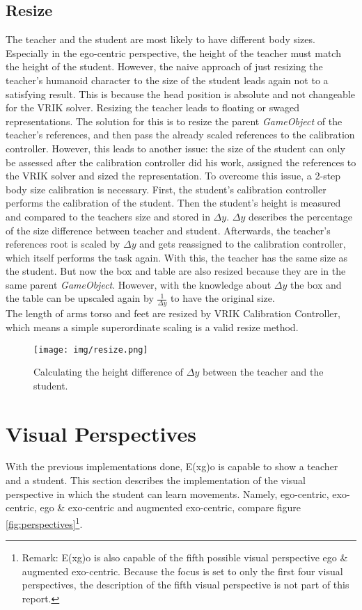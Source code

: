 \subsection{Resize}
The teacher and the student are most likely to have different body sizes. Especially in the ego-centric perspective, the height of the teacher must match the height of the student. However, the naive approach of just resizing the teacher's humanoid character to the size of the student leads again not to a satisfying result. This is because the head position is absolute and not changeable for the VRIK solver. Resizing the teacher leads to floating or swaged representations. The solution for this is to resize the parent \textit{GameObject} of the teacher's references, and then pass the already scaled references to the calibration controller. However, this leads to another issue: the size of the student can only be assessed after the calibration controller did his work, assigned the references to the VRIK solver and sized the representation. To overcome this issue, a 2-step body size calibration is necessary. First, the student's calibration controller performs the calibration of the student. Then the student's height is measured and compared to the teachers size and stored in $\Delta y$. $\Delta y$ describes the percentage of the size difference between teacher and student. Afterwards, the teacher's references root is scaled by $\Delta y$ and gets reassigned to the calibration controller, which itself performs the task again. With this, the teacher has the same size as the student. But now the box and table are also resized because they are in the same parent \textit{GameObject}. However, with the knowledge about $\Delta y$ the box and the table can be upscaled again by $\frac{1}{\Delta y}$ to have the original size.\\
The length of arms torso and feet are resized by VRIK Calibration Controller, which means a simple superordinate scaling is a valid resize method.
\begin{figure}
	\centering
	\texttt{[image: img/resize.png]}
	\caption{Calculating the height difference of $\Delta y$ between the teacher and the student.}
	\label{fig:resize}
\end{figure}


\section{Visual Perspectives}
With the previous implementations done, E(x\textbar g)o is capable to show a teacher and a student. This section describes the implementation of the visual perspective in which the student can learn movements. Namely, ego-centric, exo-centric, ego \& exo-centric and augmented exo-centric, compare figure \ref{fig:perspectives}\footnote{Remark: E(x\textbar g)o is also capable of the fifth possible visual perspective ego \& augmented exo-centric. Because the focus is set to only the first four visual perspectives, the description of the fifth visual perspective is not part of this report.}.

